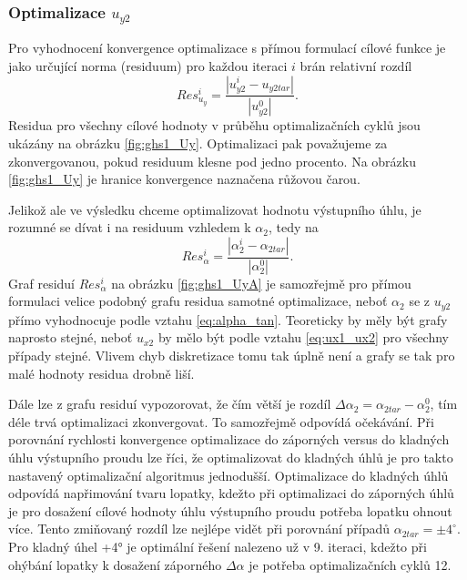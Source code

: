 \subsubsection{Optimalizace $ u_{y2} $}


Pro vyhodnocení konvergence optimalizace s přímou formulací cílové funkce je jako určující norma (residuum) pro každou iteraci $ i $ brán relativní rozdíl
\begin{equation}\label{eq:res_uy}
Res_{u_{y}}^i=\dfrac{|u_{y2}^i-u_{y2tar}|}{|u_{y2}^0|}.
\end{equation}
Residua pro všechny cílové hodnoty v průběhu optimalizačních cyklů jsou ukázány na obrázku \ref{fig:ghs1_Uy}.
Optimalizaci pak považujeme za zkonvergovanou, pokud residuum klesne pod jedno procento. Na obrázku \ref{fig:ghs1_Uy} je hranice konvergence naznačena růžovou čarou.

Jelikož ale ve výsledku chceme optimalizovat hodnotu výstupního úhlu, je rozumné se dívat i na residuum vzhledem k $ \alpha_2 $, tedy na 
\begin{equation}\label{eq:res_alpha}
Res_{\alpha}^i=\dfrac{|\alpha_{2}^i-\alpha_{2tar}|}{|\alpha_{2}^0|}.
\end{equation}
Graf residuí $ Res_{\alpha}^i $ na obrázku \ref{fig:ghs1_UyA} je samozřejmě pro přímou formulaci velice podobný grafu residua samotné optimalizace, neboť $ \alpha_2 $ se z $ u_{y2} $ přímo vyhodnocuje podle vztahu \ref{eq:alpha_tan}. Teoreticky by měly být grafy naprosto stejné, neboť $ u_{x2} $ by mělo být podle vztahu \ref{eq:ux1_ux2} pro všechny případy stejné. Vlivem chyb diskretizace tomu tak úplně není a grafy se tak pro malé hodnoty residua drobně liší.

Dále lze z grafu residuí vypozorovat, že čím větší je rozdíl $ \Delta \alpha_{2} = \alpha_{2tar} - \alpha_{2}^{0}$, tím déle trvá optimalizaci zkonvergovat. To samozřejmě odpovídá očekávání. Při porovnání rychlosti konvergence optimalizace do záporných versus do kladných úhlu výstupního proudu lze říci, že optimalizovat do kladných úhlů je pro takto nastavený optimalizační algoritmus jednodušší. Optimalizace do kladných úhlů odpovídá napřimování tvaru lopatky, kdežto při optimalizaci do záporných úhlů je pro dosažení cílové hodnoty úhlu výstupního proudu potřeba lopatku ohnout více. Tento zmiňovaný rozdíl lze nejlépe vidět při porovnání případů $ \alpha_{2tar}=\pm 4^{\circ} $. Pro kladný úhel +4° je optimální řešení nalezeno už v 9. iteraci, kdežto při ohýbání lopatky k dosažení záporného $ \Delta\alpha $ je potřeba optimalizačních cyklů 12.

